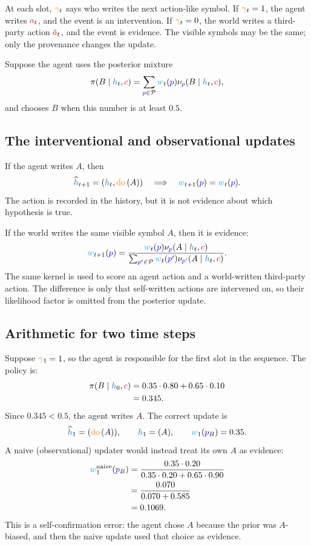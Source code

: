 \documentclass[11pt]{article}
\newcommand{\ProgramSet}{\mathcal{P}}
\newcommand{\action}{\ensuremath{\textcolor{red}{a}}}
\newcommand{\program}{\ensuremath{\textcolor{blue}{p}}}
\newcommand{\contextsym}{\ensuremath{\textcolor{purple}{c}}}
\newcommand{\gate}{\ensuremath{\textcolor{orange}{\gamma}}}
\newcommand{\weight}{\ensuremath{\textcolor{cyan}{w}}}
\newcommand{\history}{\ensuremath{\textcolor{RoyalBlue}{h}}}
\newcommand{\policy}{\ensuremath{\pi}}
\newcommand{\kernel}{\ensuremath{\nu}}
\newcommand{\naiveweight}{\ensuremath{\weight^{\mathrm{naive}}}}
\newcommand{\thirdaction}{\ensuremath{\tilde{\action}}}
\newcommand{\dohistory}{\ensuremath{\widehat{\history}}}
\newcommand{\doop}{\operatorname{\textcolor{orange}{do}}}
\newcommand{\intervene}[1]{\ensuremath{\doop \left(#1\right)}}
\newcommand{\trueprog}{\ensuremath{\program_B}}
\begin{document}
At each slot, \(\gate_t\) says who writes the next action-like symbol. If
\(\gate_t=1\), the agent writes \(\action_t\), and the event is an intervention.
If \(\gate_t=0\), the world writes a third-party action \(\thirdaction_t\), and
the event is evidence. The visible symbols may be the same; only the provenance
changes the update.

Suppose the agent uses the posterior mixture
\[
  \policy(B\mid \history_t,\contextsym)
  =
  \sum_{\program\in\ProgramSet}
  \weight_t(\program)\kernel_{\program}(B\mid \history_t,\contextsym),
\]
and chooses \(B\) when this number is at least \(0.5\).

\subsection{The interventional and observational updates}

If the agent writes \(A\), then
\[
  \dohistory_{t+1}=(\history_t,\intervene{A})
  \quad\Longrightarrow\quad
  \weight_{t+1}(\program)=\weight_t(\program).
\]
The action is recorded in the history, but it is not evidence about which
hypothesis is true.

If the world writes the same visible symbol \(A\), then it is evidence:
\[
  \weight_{t+1}(\program)
  =
  \frac{
    \weight_t(\program)\kernel_{\program}(A\mid \history_t,\contextsym)
  }{
    \sum_{\program'\in\ProgramSet}
    \weight_t(\program')\kernel_{\program'}(A\mid \history_t,\contextsym)
  }.
\]
The same kernel is used to score an agent action and a world-written third-party
action. The difference is only that self-written actions are intervened on, so
their likelihood factor is omitted from the posterior update.

\subsection{Arithmetic for two time steps}

Suppose \(\gate_1 =1\), so the agent is responsible for the first slot in the sequence. The policy is: 
\[
\begin{aligned}
\policy(B\mid \history_0,\contextsym)
&=0.35\cdot 0.80+0.65\cdot 0.10\\
&=0.345.
\end{aligned}
\]
Since \(0.345<0.5\), the agent writes \(A\). The correct update is
\[
  \dohistory_1=(\intervene{A}),
  \qquad
  \history_1=(A),
  \qquad
  \weight_1(\trueprog)=0.35.
\]
A naive (observational) updater would instead treat its own \(A\) as evidence:
\[
\begin{aligned}
\naiveweight_1(\trueprog)
&=
\frac{0.35\cdot 0.20}
     {0.35\cdot 0.20+0.65\cdot 0.90}\\
&=
\frac{0.070}{0.070+0.585}\\
&=0.1069.
\end{aligned}
\]
This is a self-confirmation error: the agent chose \(A\) because the prior was
$A$-biased, and then the naive update used that choice as evidence.
\end{document}
